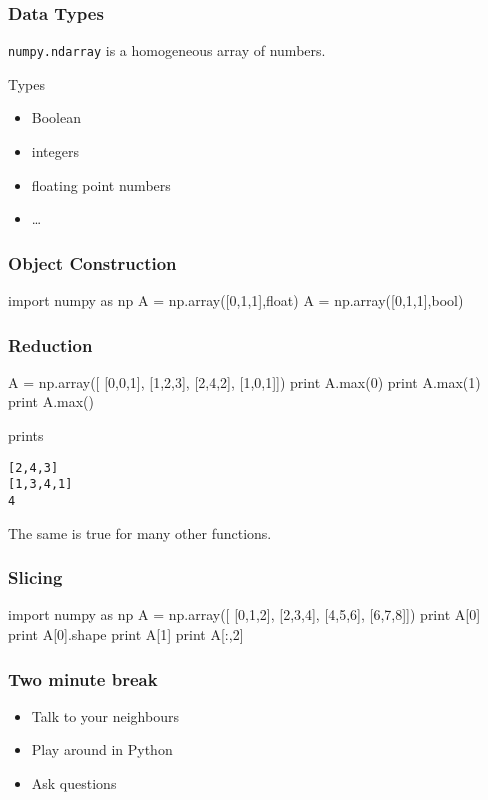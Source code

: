\begin{frame}[fragile]
\frametitle{Data Types}

\lstinline{numpy.ndarray} is a homogeneous array of numbers.

\begin{block}{Types}
\begin{itemize}
\item Boolean
\item integers
\item floating point numbers
\item \ldots
\end{itemize}
\end{block}

\end{frame}

\begin{frame}[fragile]
\frametitle{Object Construction}

\begin{python}
import numpy as np
A = np.array([0,1,1],float)
A = np.array([0,1,1],bool)
\end{python}
\end{frame}

\begin{frame}[fragile]
\frametitle{Reduction}

\begin{python}
A = np.array([
    [0,0,1],
    [1,2,3],
    [2,4,2],
    [1,0,1]])
print A.max(0)
print A.max(1)
print A.max()
\end{python}
prints
\begin{verbatim}
[2,4,3]
[1,3,4,1]
4
\end{verbatim}

The same is true for many other functions.
\end{frame}

\begin{frame}[fragile]
\frametitle{Slicing}

\begin{python}
import numpy as np
A = np.array([
    [0,1,2],
    [2,3,4],
    [4,5,6],
    [6,7,8]])
print A[0]
print A[0].shape
print A[1]
print A[:,2]
\end{python}
\end{frame}

\begin{frame}[fragile]
\frametitle{Two minute break}
\begin{itemize}
\item Talk to your neighbours
\item Play around in Python
\item Ask questions
\end{itemize}
\end{frame}

